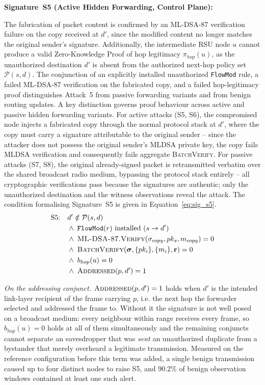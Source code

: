 \documentclass[12pt, a4paper]{report}
\begin{document}
\textbf{Signature~S5 (Active Hidden Forwarding, Control Plane):}

The fabrication of packet content is confirmed by an ML-DSA-87 verification
failure on the copy received at $d'$, since the modified content no longer
matches the original sender's signature.
Additionally, the intermediate RSU node $u$ cannot produce a valid
Zero-Knowledge Proof of hop legitimacy $\pi_{hop}(u)$, as the unauthorized
destination $d'$ is absent from the authorized next-hop policy set
$\mathcal{P}(s,d)$.
The conjunction of an explicitly installed unauthorized \texttt{FlowMod}
rule, a failed ML-DSA-87 verification on the fabricated copy, and a failed
hop-legitimacy proof distinguishes Attack~5 from passive forwarding variants and from benign routing updates. A key distinction governs proof behaviour across active
and passive hidden forwarding variants. For active attacks
(S5, S6), the compromised node injects a fabricated copy
through the normal protocol stack at $d'$, where the
copy must carry a signature attributable to the original
sender -- since the attacker does not possess the
original sender's \ac{MLDSA} private key, the copy
fails \ac{MLDSA} verification and consequently fails
aggregate \textsc{BatchVerify}. For passive attacks
(S7, S8), the original already-signed packet is
retransmitted verbatim over the shared broadcast radio
medium, bypassing the protocol stack entirely -- all
cryptographic verifications pass because the
signatures are authentic; only the unauthorized
destination and the witness observations reveal the
attack.
The condition formalising Signature~S5 is given in
Equation~\eqref{eq:sig_s5}.
\begin{equation}
\begin{aligned}
\text{S5:}\quad
  & d' \notin \mathcal{P}(s,d) \\
  & \wedge\; \texttt{FlowMod}(r)
    \text{ installed } (s \to d') \\
  & \wedge\; \textsc{ML-DSA-87.Verify}(
    \sigma_{copy}, pk_s, m_{copy}) = 0 \\
  & \wedge\; \textsc{BatchVerify}(
    \boldsymbol{\sigma},\{pk_i\},\{m_i\},
    \mathbf{r}) = 0 \\
  & \wedge\; b_{hop}(u) = 0 \\
  & \wedge\; \textsc{Addressed}(p, d') = 1
\end{aligned}
\label{eq:sig_s5}
\end{equation}

\textit{On the addressing conjunct.} $\textsc{Addressed}(p,d')=1$ holds when
$d'$ is the intended link-layer recipient of the frame carrying $p$, i.e. the
next hop the forwarder selected and addressed the frame to. Without it the
signature is not well posed on a broadcast medium: every neighbour within range
receives every frame, so $b_{hop}(u)=0$ holds at all of them simultaneously and
the remaining conjuncts cannot separate an eavesdropper that was \emph{sent} an
unauthorized duplicate from a bystander that merely overheard a legitimate
transmission. Measured on the reference configuration before this term was
added, a single benign transmission caused up to four distinct nodes to raise
S5, and $90.2\%$ of benign observation windows contained at least one such
alert.
\end{document}
